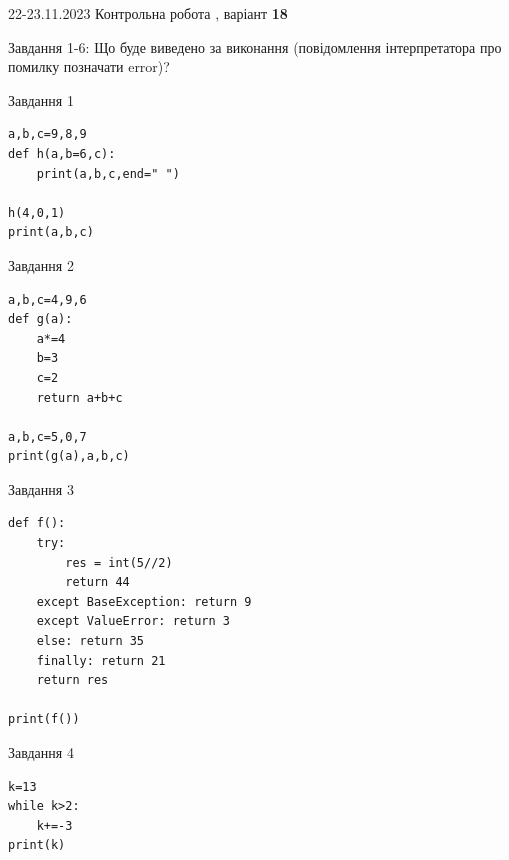 \documentclass[12pt, ukrainian]{article}
\begin{document}
{{22-23.11.2023 Контрольна робота , варіант  \No \textbf { 18 }\par}}
{

Завдання 1-6: Що буде виведено за виконання (повідомлення інтерпретатора про помилку позначати error)?


\begin{minipage}[t]{9.7cm}                
{\begin{center}Завдання {1}\end{center}}
\begin{verbatim}
a,b,c=9,8,9
def h(a,b=6,c):
    print(a,b,c,end=" ")

h(4,0,1)
print(a,b,c)
\end{verbatim}     
\end{minipage}
\vline \hspace{8mm}
\begin{minipage}[t]{8.0cm}                
{\begin{center}Завдання {2}\end{center}}
\begin{verbatim}
a,b,c=4,9,6
def g(a):
    a*=4
    b=3
    c=2
    return a+b+c

a,b,c=5,0,7
print(g(a),a,b,c)
\end{verbatim}     
\end{minipage}

\vspace{15mm}
\begin{minipage}[t]{9.7cm}                
{\begin{center}Завдання {3}\end{center}}
\begin{verbatim}
def f():
    try:
        res = int(5//2)
        return 44
    except BaseException: return 9
    except ValueError: return 3
    else: return 35
    finally: return 21
    return res

print(f())
\end{verbatim}     
\end{minipage}
\vline \hspace{8mm}
\begin{minipage}[t]{8.0cm}                
{\begin{center}Завдання {4}\end{center}}
\begin{verbatim}
k=13
while k>2:
    k+=-3
print(k)
\end{verbatim}     
\end{minipage}

}
\end{document}
